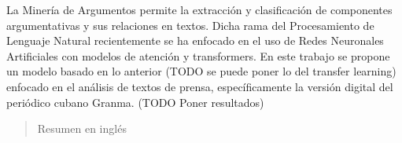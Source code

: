 \begin{resumen}

La Minería de Argumentos permite la extracción y clasificación de componentes argumentativas 
y sus relaciones en textos. Dicha rama del Procesamiento de Lenguaje Natural recientemente se
ha enfocado en el uso de Redes Neuronales Artificiales con modelos de atención y transformers.
En este trabajo se propone un modelo basado en lo anterior (TODO se puede poner lo del transfer learning)
enfocado en el análisis de textos de prensa, específicamente la versión digital del periódico
cubano Granma. (TODO Poner resultados)

\end{resumen}

\begin{abstract}
	Resumen en inglés
\end{abstract}